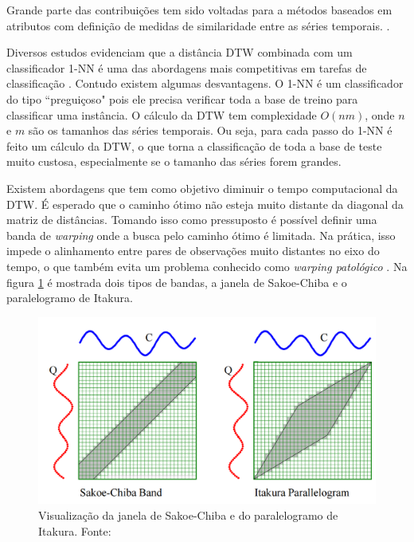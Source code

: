 Grande parte das contribuições tem sido voltadas para a métodos baseados em atributos com definição de medidas de similaridade entre as séries temporais. \cite{Keogh2003}.

Diversos estudos evidenciam que a distância DTW combinada com um classificador 1-NN é uma das abordagens mais competitivas em tarefas de classificação \cite{Wang2013} \cite{Lines2015} \cite{giusti2013}. Contudo existem algumas desvantagens. O 1-NN é um classificador do tipo ``preguiçoso" pois ele precisa verificar toda a base de treino para classificar uma instância. O cálculo da DTW tem complexidade $O(nm)$, onde $n$ e $m$ são os tamanhos das séries temporais. Ou seja, para cada passo do 1-NN é feito um cálculo da DTW, o que torna a classificação de toda a base de teste muito custosa, especialmente se o tamanho das séries forem grandes.

Existem abordagens que tem como objetivo diminuir o tempo computacional da DTW. É esperado que o caminho ótimo não esteja muito distante da diagonal da matriz de distâncias. Tomando isso como pressuposto é possível definir uma banda de \textit{warping} onde a busca pelo caminho ótimo é limitada. Na prática, isso impede o alinhamento entre pares de observações muito distantes no eixo do tempo, o que também evita um problema conhecido como \textit{warping patológico} \cite{ratanamahatana2004everything}. Na figura \ref{fig-janeladtw} é mostrada dois tipos de bandas, a janela de Sakoe-Chiba e o paralelogramo de Itakura.
\begin{figure}[H]
	\centering
	\includegraphics[scale=0.25]{pasta1_figuras/janela-dtw.png}
	\caption {Visualização da janela de Sakoe-Chiba e do paralelogramo de Itakura. Fonte: \cite{Ratanamahatana2004MakingTC}}
	\label{fig-janeladtw}
\end{figure}

